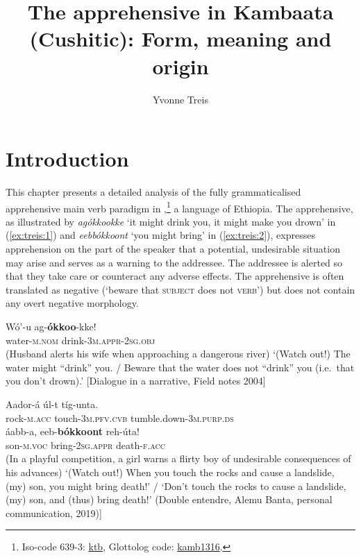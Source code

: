\documentclass[output=paper,colorlinks,citecolor=brown,]{langscibook}
\author{Yvonne Treis\affiliation{CNRS-LLACAN}}
\title{The apprehensive in Kambaata (Cushitic): Form, meaning and origin}
\begin{document}
\maketitle


\section{Introduction}\label{sec:treis:1}

This chapter presents a detailed analysis of the fully grammaticalised apprehensive main verb paradigm in ,\footnote{Iso-code 639-3: \href{https://iso639-3.sil.org/code/ktb} {ktb}, Glottolog code: \href{https://glottolog.org/resource/languoid/id/kamb1316} {kamb1316}.} a  language of Ethiopia. The apprehensive, as illustrated by \textit{agókkookke} `it might drink you, it might make you drown' in (\ref{ex:treis:1}) and \textit{eebbókkoont} `you might bring' in (\ref{ex:treis:2}), expresses apprehension on the part of the speaker that a potential, undesirable situation may arise and serves as a warning to the addressee. The addressee is alerted so that they take care or counteract any adverse effects. The apprehensive is often translated as negative (`beware that \textsc{subject} does not \textsc{verb}') but does not contain any overt negative morphology.

\ea\label{ex:treis:1} 
\gll Wó'-u ag-\textbf{ókkoo}-kke! \\
water-\textsc{m.nom} drink-\textsc{3m.appr-2sg.obj}\\
\glt (Husband alerts his wife when approaching a dangerous river) `(Watch out!) The water might ``drink'' you. / Beware that the water does not ``drink'' you (i.e.\ that you don't drown).' [Dialogue in a narrative, Field notes 2004]
\z

\ea\label{ex:treis:2}
\gll Aador-á			úl-t				tíg-unta.\\
rock-\textsc{m.acc} touch-\textsc{3m.pfv.cvb} tumble.down-\textsc{3m.purp.ds}\\ \newline
\gll áabb-a,		eeb-\textbf{bókkoont} reh-úta! \\
son-\textsc{m.voc}	bring-\textsc{2sg.appr} 	death-\textsc{f.acc}\\
\glt (In a playful competition, a girl warns a flirty boy of undesirable consequences of his advances) `(Watch out!) When you touch the rocks and cause a landslide, (my) son, you might bring death!' / `Don't touch the rocks to cause a landslide, (my) son, and (thus) bring death!' (Double entendre, Alemu Banta, personal communication, 2019)\footnotemark]
\z
{}
\end{document}
